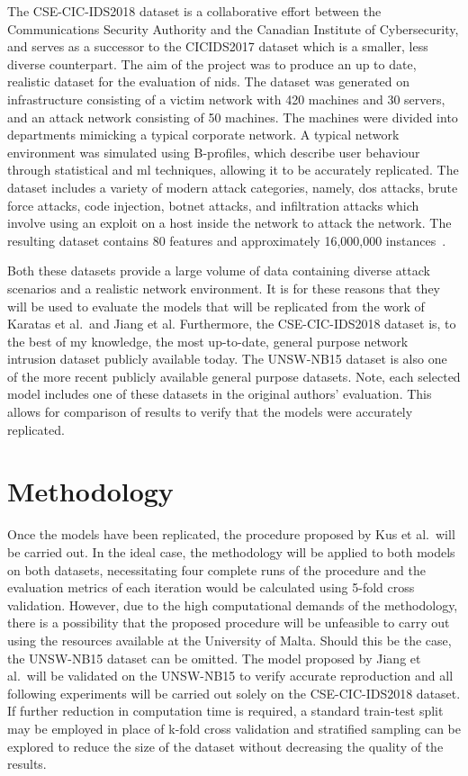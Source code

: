 The CSE-CIC-IDS2018 dataset is a collaborative effort between the
Communications Security Authority and the Canadian Institute of Cybersecurity,
and serves as a successor to the CICIDS2017 dataset which is a smaller, less
diverse counterpart. The aim of the project was to produce an up to date,
realistic dataset for the evaluation of \gls{nids}. The dataset was generated
on infrastructure consisting of a victim network with 420 machines and 30
servers, and an attack network consisting of 50 machines. The machines were
divided into departments mimicking a typical corporate network. A typical
network environment was simulated using B-profiles, which describe user
behaviour through statistical and \gls{ml} techniques, allowing it to be
accurately replicated. The dataset includes a variety of modern attack
categories, namely, \gls{dos} attacks, brute force attacks, code injection,
botnet attacks, and infiltration attacks which involve using an exploit on a
host inside the network to attack the network. The resulting dataset contains
80 features and approximately 16,000,000 instances~\cite{cic2018, cic2018data}.

Both these datasets provide a large volume of data containing diverse attack
scenarios and a realistic network environment. It is for these reasons that
they will be used to evaluate the models that will be replicated from the work
of Karatas et al.\ and Jiang et al. Furthermore, the CSE-CIC-IDS2018 dataset
is, to the best of my knowledge, the most up-to-date, general purpose network
intrusion dataset publicly available today. The UNSW-NB15 dataset is also one
of the more recent publicly available general purpose datasets. Note, each
selected model includes one of these datasets in the original authors'
evaluation. This allows for comparison of results to verify that the models
were accurately replicated.

\section{Methodology}%
\label{sec:methodology}

Once the models have been replicated, the procedure proposed by Kus et al.\
will be carried out. In the ideal case, the methodology will be applied to both
models on both datasets, necessitating four complete runs of the procedure and
the evaluation metrics of each iteration would be calculated using 5-fold cross
validation. However, due to the high computational demands of the methodology,
there is a possibility that the proposed procedure will be unfeasible to carry
out using the resources available at the University of Malta. Should this be
the case, the UNSW-NB15 dataset can be omitted. The model proposed by Jiang et
al.\ will be validated on the UNSW-NB15 to verify accurate reproduction and all
following experiments will be carried out solely on the CSE-CIC-IDS2018
dataset. If further reduction in computation time is required, a standard
train-test split may be employed in place of k-fold cross validation and
stratified sampling can be explored to reduce the size of the dataset without
decreasing the quality of the results.

